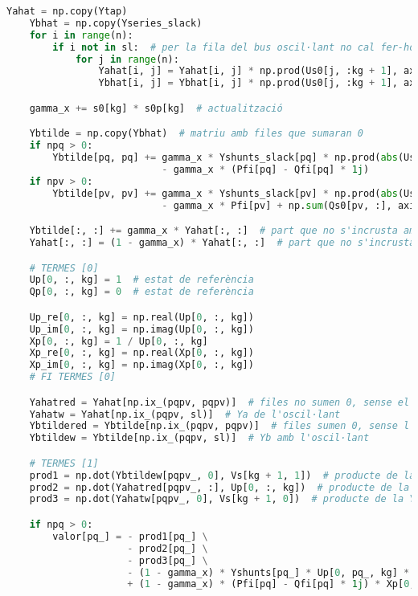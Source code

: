 \begin{lstlisting}[language=Python,numbers=none]
    Yahat = np.copy(Ytap)
    Ybhat = np.copy(Yseries_slack)
    for i in range(n):
        if i not in sl:  # per la fila del bus oscil·lant no cal fer-ho
            for j in range(n):
                Yahat[i, j] = Yahat[i, j] * np.prod(Us0[j, :kg + 1], axis=0) * np.prod(np.conj(Us0[i, :kg + 1]), axis=0)
                Ybhat[i, j] = Ybhat[i, j] * np.prod(Us0[j, :kg + 1], axis=0) * np.prod(np.conj(Us0[i, :kg + 1]), axis=0)

    gamma_x += s0[kg] * s0p[kg]  # actualització

    Ybtilde = np.copy(Ybhat)  # matriu amb files que sumaran 0
    if npq > 0:
        Ybtilde[pq, pq] += gamma_x * Yshunts_slack[pq] * np.prod(abs(Us0[pq, :kg + 1]) ** 2, axis=1) \
                           - gamma_x * (Pfi[pq] - Qfi[pq] * 1j)
    if npv > 0:
        Ybtilde[pv, pv] += gamma_x * Yshunts_slack[pv] * np.prod(abs(Us0[pv, :kg + 1]) ** 2, axis=1) \
                           - gamma_x * Pfi[pv] + np.sum(Qs0[pv, :], axis=1) * 1j

    Ybtilde[:, :] += gamma_x * Yahat[:, :]  # part que no s'incrusta amb s'
    Yahat[:, :] = (1 - gamma_x) * Yahat[:, :]  # part que no s'incrusta amb s'

    # TERMES [0]
    Up[0, :, kg] = 1  # estat de referència
    Qp[0, :, kg] = 0  # estat de referència

    Up_re[0, :, kg] = np.real(Up[0, :, kg])
    Up_im[0, :, kg] = np.imag(Up[0, :, kg])
    Xp[0, :, kg] = 1 / Up[0, :, kg]
    Xp_re[0, :, kg] = np.real(Xp[0, :, kg])
    Xp_im[0, :, kg] = np.imag(Xp[0, :, kg])
    # FI TERMES [0]

    Yahatred = Yahat[np.ix_(pqpv, pqpv)]  # files no sumen 0, sense el bus oscil·lant
    Yahatw = Yahat[np.ix_(pqpv, sl)]  # Ya de l'oscil·lant
    Ybtildered = Ybtilde[np.ix_(pqpv, pqpv)]  # files sumen 0, sense l'oscil·lant
    Ybtildew = Ybtilde[np.ix_(pqpv, sl)]  # Yb amb l'oscil·lant

    # TERMES [1]
    prod1 = np.dot(Ybtildew[pqpv_, 0], Vs[kg + 1, 1])  # producte de la Yb amb el bus oscil·lant
    prod2 = np.dot(Yahatred[pqpv_, :], Up[0, :, kg])  # producte de la Ya amb la tensió incògnita
    prod3 = np.dot(Yahatw[pqpv_, 0], Vs[kg + 1, 0])  # producte de la Ya amb el bus oscil·lant

    if npq > 0:
        valor[pq_] = - prod1[pq_] \
                     - prod2[pq_] \
                     - prod3[pq_] \
                     - (1 - gamma_x) * Yshunts[pq_] * Up[0, pq_, kg] * np.prod(abs(Us0[pq, :kg + 1]), axis=1) ** 2 \
                     + (1 - gamma_x) * (Pfi[pq] - Qfi[pq] * 1j) * Xp[0, pq_, kg]


\end{lstlisting}
